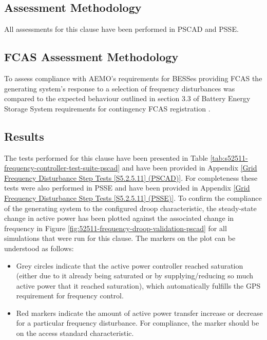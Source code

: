 \documentclass{../grid-link-report}
\begin{document}
	\subsection{Assessment Methodology}
	\label{subsec:s52511-assessment-methodology}
	
	
	All assessments for this clause have been performed in PSCAD and PSSE.
	
	\subsection{FCAS Assessment Methodology}
	To assess compliance with AEMO's requirements for BESSes providing FCAS the generating system's response to a selection of frequency disturbances was compared to the expected behaviour outlined in section 3.3 of Battery Energy Storage System requirements for contingency FCAS registration \cite{aemo-fcas}.
	
	\subsection{Results}
	The tests performed for this clause have been presented in Table \ref{tab:s52511-frequency-controller-test-suite-pscad} and have been provided in Appendix \ref{Grid Frequency Disturbance Step Tests [S5.2.5.11] (PSCAD)}. For completeness these tests were also performed in PSSE and have been provided in Appendix \ref{Grid Frequency Disturbance Step Tests [S5.2.5.11] (PSSE)}. To confirm the compliance of the generating system to the configured droop characteristic, the steady-state change in active power has been plotted against the associated change in frequency in Figure \ref{fig:52511-frequency-droop-validation-pscad} for all simulations that were run for this clause. The markers on the plot can be understood as follows:
	
	\begin{itemize}
		\item Grey circles indicate that the active power controller reached saturation (either due to it already being saturated or by supplying/reducing so much active power that it reached saturation), which automatically fulfills the GPS requirement for frequency control.
		\item Red markers indicate the amount of active power transfer increase or decrease for a particular frequency disturbance. For compliance, the marker should be on the access standard characteristic.
	\end{itemize}
	
\end{document}
